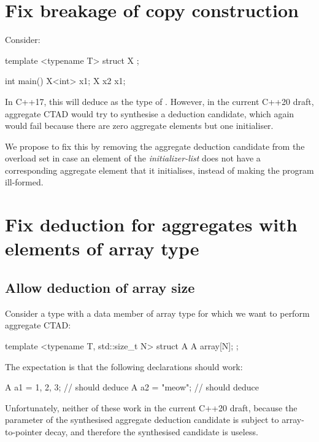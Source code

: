 \section{Fix breakage of copy construction}

Consider:

\begin{codeblock}
template <typename T>
struct X {};

int main() {
  X<int> x1;
  X x2 {x1};
}
\end{codeblock}

In C++17, this will deduce  as the type of . However, in the current C++20 draft, aggregate CTAD would try to synthesise a deduction candidate, which again would fail because there are zero aggregate elements but one initialiser.

\pagebreak

We propose to fix this by removing the aggregate deduction candidate from the overload set in case an element of the \emph{initializer-list} does not have a corresponding aggregate element that it initialises, instead of making the program ill-formed.

\section{Fix deduction for aggregates with elements of array type}

\subsection{Allow deduction of array size}

Consider a type with a data member of array type for which we want to perform aggregate CTAD:

\begin{codeblock}
template <typename T, std::size_t N>
struct A {
  A array[N];
};
\end{codeblock}

The expectation is that the following declarations should work:

\begin{codeblock}
A a1 = {{1, 2, 3}};  // should deduce 
A a2 = {"meow"};     // should deduce 
\end{codeblock}

Unfortunately, neither of these work in the current C++20 draft, because the parameter of the synthesised aggregate deduction candidate is subject to array-to-pointer decay, and therefore the synthesised candidate is useless.

